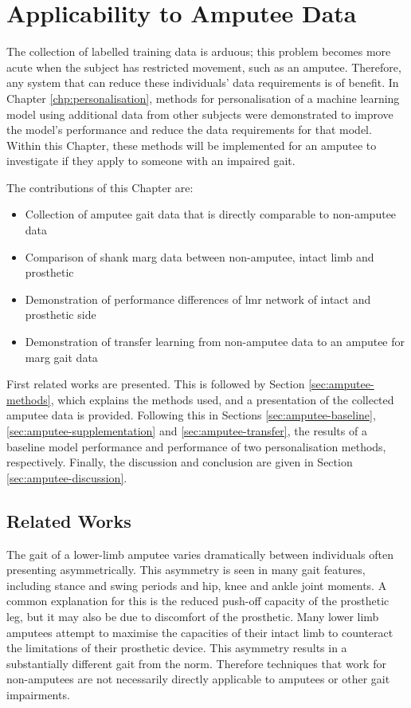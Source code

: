 \chapter{Applicability to Amputee Data}
\label{chp:amputee-data}

The collection of labelled training data is arduous; this problem becomes more acute when the subject has restricted movement, such as an amputee. Therefore, any system that can reduce these individuals' data requirements is of benefit. In Chapter \ref{chp:personalisation}, methods for personalisation of a machine learning model using additional data from other subjects were demonstrated to improve the model's performance and reduce the data requirements for that model. Within this Chapter, these methods will be implemented for an amputee to investigate if they apply to someone with an impaired gait.

The contributions of this Chapter are:
\begin{itemize}
    \item Collection of amputee gait data that is directly comparable to non-amputee data
    \item Comparison of shank \acrshort{marg} data between non-amputee, intact limb and prosthetic
    \item Demonstration of performance differences of \acrshort{lmr} network of intact and prosthetic side
    \item Demonstration of transfer learning from non-amputee data to an amputee for \acrshort{marg} gait data
\end{itemize}

First related works are presented. This is followed by Section \ref{sec:amputee-methods}, which explains the methods used, and a presentation of the collected amputee data is provided. Following this in Sections \ref{sec:amputee-baseline}, \ref{sec:amputee-supplementation} and \ref{sec:amputee-transfer}, the results of a baseline model performance and performance of two personalisation methods, respectively. Finally, the discussion and conclusion are given in Section \ref{sec:amputee-discussion}.


\section{Related Works}
\label{sec:amputee-related-works}
The gait of a lower-limb amputee varies dramatically between individuals\cite{Lonini2016} often presenting asymmetrically\cite{Roerdink2012}. This asymmetry is seen in many gait features, including stance and swing periods and hip, knee and ankle joint moments\cite{Adamczyk2015, Harandi2020}. A common explanation for this is the reduced push-off capacity of the prosthetic leg, but it may also be due to discomfort of the prosthetic\cite{Hak2014}. Many lower limb amputees attempt to maximise the capacities of their intact limb to counteract the limitations of their prosthetic device\cite{Ochoa-Diaz2020}. This asymmetry results in a substantially different gait from the norm. Therefore techniques that work for non-amputees are not necessarily directly applicable to amputees or other gait impairments\cite{Jamieson2021}.

